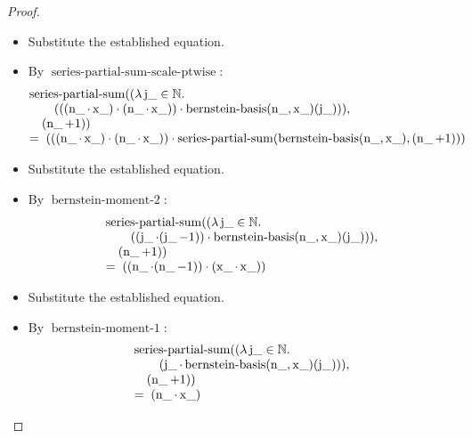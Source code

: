 \documentclass[11pt]{article}
\theoremstyle{plain}
\begin{document}
\begin{proof}
\begin{itemize}[leftmargin=2.8em, itemsep=4pt, parsep=1pt]
  \item[\textbf{145}] Substitute the established equation.
  \item[\textbf{146}] By $\operatorname{series\text{-}partial\text{-}sum\text{-}scale\text{-}ptwise}$:
\begin{equation*}
\begin{array}{@{}l@{}} \operatorname{series\text{-}partial\text{-}sum}((\lambda \operatorname{j\_} \in \mathbb{N}.\; \\ \quad \quad (((\operatorname{n\_} \cdot \operatorname{x\_}) \cdot (\operatorname{n\_} \cdot \operatorname{x\_})) \cdot \operatorname{bernstein\text{-}basis}(\operatorname{n\_}, \operatorname{x\_})(\operatorname{j\_}))), \\ \quad (\operatorname{n\_} + 1)) \\ =\; (((\operatorname{n\_} \cdot \operatorname{x\_}) \cdot (\operatorname{n\_} \cdot \operatorname{x\_})) \cdot \operatorname{series\text{-}partial\text{-}sum}(\operatorname{bernstein\text{-}basis}(\operatorname{n\_}, \operatorname{x\_}), (\operatorname{n\_} + 1))) \end{array}
\end{equation*}

  \item[\textbf{147}] Substitute the established equation.
  \item[\textbf{148}] By $\operatorname{bernstein\text{-}moment\text{-}2}$:
\begin{equation*}
\begin{array}{@{}l@{}} \operatorname{series\text{-}partial\text{-}sum}((\lambda \operatorname{j\_} \in \mathbb{N}.\; \\ \quad \quad ((\operatorname{j\_} \cdot (\operatorname{j\_} - 1)) \cdot \operatorname{bernstein\text{-}basis}(\operatorname{n\_}, \operatorname{x\_})(\operatorname{j\_}))), \\ \quad (\operatorname{n\_} + 1)) \\ =\; ((\operatorname{n\_} \cdot (\operatorname{n\_} - 1)) \cdot (\operatorname{x\_} \cdot \operatorname{x\_})) \end{array}
\end{equation*}

  \item[\textbf{149}] Substitute the established equation.
  \item[\textbf{150}] By $\operatorname{bernstein\text{-}moment\text{-}1}$:
\begin{equation*}
\begin{array}{@{}l@{}} \operatorname{series\text{-}partial\text{-}sum}((\lambda \operatorname{j\_} \in \mathbb{N}.\; \\ \quad \quad (\operatorname{j\_} \cdot \operatorname{bernstein\text{-}basis}(\operatorname{n\_}, \operatorname{x\_})(\operatorname{j\_}))), \\ \quad (\operatorname{n\_} + 1)) \\ =\; (\operatorname{n\_} \cdot \operatorname{x\_}) \end{array}
\end{equation*}


\end{itemize}
\end{proof}
\end{document}
